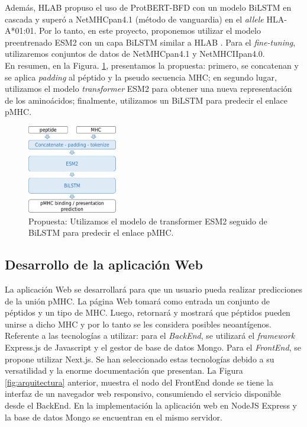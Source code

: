 \documentclass[a4paper]{article}
\begin{document}
Además, HLAB \citep{zhang2022hlab} propuso el uso de ProtBERT-BFD \citep{elnaggar2021prottrans} con un modelo BiLSTM en cascada y superó a NetMHCpan4.1 (método de vanguardia) en el \textit{allele} HLA-A*01:01. Por lo tanto, en este proyecto, proponemos utilizar el modelo preentrenado ESM2 \citep{lin2023evolutionary} con un capa BiLSTM  similar a HLAB \citep{zhang2022hlab}. Para el \textit{fine-tuning}, utilizaremos conjuntos de datos de NetMHCpan4.1 y NetMHCIIpan4.0.\\

En resumen, en la Figura. \ref{fig:proposal}, presentamos la propuesta: primero, se concatenan y se aplica \textit{padding} al péptido y la pseudo secuencia MHC; en segundo lugar, utilizamos el modelo \textit{transformer} ESM2 para obtener una nueva representación de los aminoácidos; finalmente, utilizamos un BiLSTM para predecir el enlace pMHC. 





\begin{figure}[H]
	\centering
	\includegraphics[width=0.35\textwidth]{img/neoantigen/proposal1}
	\caption{Propuesta: Utilizamos el modelo de transformer ESM2 seguido de BiLSTM para predecir el enlace pMHC.}
	\label{fig:proposal}
\end{figure}

\subsection{Desarrollo de la aplicación Web}

La aplicación Web se desarrollará para que un usuario pueda realizar predicciones de la unión pMHC. La página Web tomará como entrada un conjunto de péptidos y un tipo de MHC. Luego, retornará y mostrará que péptidos pueden unirse a dicho MHC y por lo tanto se les considera posibles neoantígenos.\\

Referente a las tecnologías a utilizar: para el \textit{BackEnd}, se utilizará el \textit{framework} Express.js de Javascript y el gestor de base de datos Mongo. Para el \textit{FrontEnd}, se propone utilizar Next.js. Se han seleccionado estas tecnologías debido a su versatilidad y la enorme documentación que presentan. La Figura \ref{fig:arquitectura} anterior, muestra el nodo del FrontEnd donde se tiene la interfaz de un navegador web responsivo, consumiendo el servicio disponible desde el BackEnd. En la implementación la aplicación web en NodeJS Express y la base de datos Mongo se encuentran en el mismo servidor.
\end{document}
